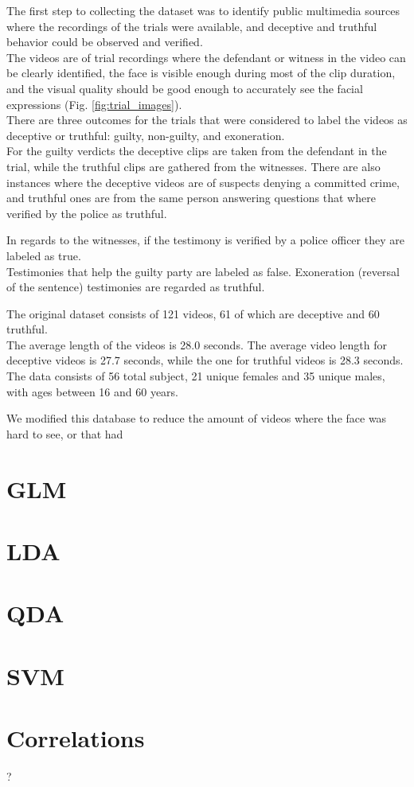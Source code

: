 The first step to collecting the dataset was to identify public multimedia sources where the recordings of the trials were available, and deceptive and truthful behavior could be observed and verified.\\
The videos are of trial recordings where the defendant or witness in the video can be clearly identified, the face is visible enough during most of the clip duration, and the visual quality should be good enough to accurately see the facial expressions (Fig. \ref{fig:trial_images}).\\
There are three outcomes for the trials that were considered to label the videos as deceptive or truthful: guilty, non-guilty, and exoneration. \\
For the guilty verdicts the deceptive clips are taken from the defendant in the trial, while the truthful clips are gathered from the witnesses. There are also instances where the deceptive videos are of suspects denying a committed crime, and truthful ones are from the same person answering questions that where verified by the police as truthful.

In regards to the witnesses, if the testimony is verified by a police officer they are labeled as true. \\ Testimonies that help the guilty party are labeled as false. Exoneration (reversal of the sentence) testimonies are regarded as truthful.

The original dataset consists of 121 videos, 61 of which are deceptive and 60 truthful. \\
The average length of the videos is 28.0 seconds. The average video length for deceptive videos is 27.7 seconds, while the one for truthful videos is 28.3 seconds. \\
The data consists of 56 total subject, 21 unique females and 35 unique males, with ages between 16 and 60 years.


We modified this database to reduce the amount of videos where the face was hard to see, or that had 


\section{GLM}

\section{LDA}

\section{QDA}

\section{SVM}

\section{Correlations} ?